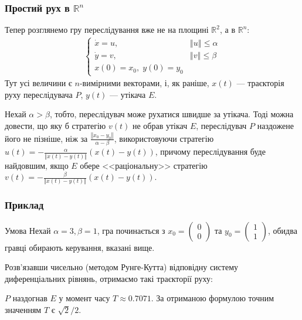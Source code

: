 \documentclass[10pt,pdf]{beamer}
\newcommand{\R}{\mathbb{R}}
\renewcommand{\d}[1]{\dot{#1}}
\newcommand{\norm}[1]{\left\Vert #1 \right\Vert}
\begin{document}
    \begin{frame}
        \frametitle{Простий рух в $\R^n$}
    
        Тепер розглянемо гру переслідування вже не на площині $\R^2$, а в $\R^n$:
        \begin{gather*}
            \begin{cases}
                \d{x} = u, & \norm{u} \leq \alpha \\
                \d{y} = v, & \norm{v} \leq \beta \\
                x(0) = x_0, \; y(0) = y_0
            \end{cases}
        \end{gather*}
        Тут усі величини є $n$-вимірними векторами, і, як раніше, $x(t)$ --- траєкторія
        руху переслідувача $P$, $y(t)$ --- утікача $E$.
    
        Нехай $\alpha > \beta$, тобто, переслідувач може рухатися швидше за утікача. 
        Тоді можна довести, що яку б стратегію $v(t)$ не обрав утікач $E$, переслідувач $P$ наздожене його не пізніше,
        ніж за $\frac{\norm{x_0 - y_0}}{\alpha - \beta}$, використовуючи стратегію $u(t) = - \frac{\alpha}{\norm{x(t) - y(t)}} (x(t) - y(t))$,
        причому переслідування буде найдовшим, якщо $E$ обере <<раціональну>> стратегію $v(t) = - \frac{\beta}{\norm{x(t) - y(t)}} (x(t) - y(t))$.

    \end{frame}
    \begin{frame}
        \frametitle{Приклад}
    
        \begin{block}{Умова}
            Нехай $\alpha = 3, \beta = 1$, гра починається з $x_0 = \begin{pmatrix}
                0 \\ 0
            \end{pmatrix}$ та $y_0 = \begin{pmatrix}
                1 \\ 1
            \end{pmatrix}$, обидва гравці обирають керування, вказані вище.
        \end{block}
        Розв'язавши чисельно (методом Рунге-Кутта) відповідну систему диференціальних рівнянь, отримаємо
        такі траєкторії руху:
        \begin{center}
            \resizebox{130pt}{!}{
                
            }
        \end{center}
        $P$ наздогнав $E$ у момент часу $T \approx 0.7071$. За отриманою формулою точним значенням $T$ є $\sqrt{2}/2$.
    \end{frame}
\end{document}
